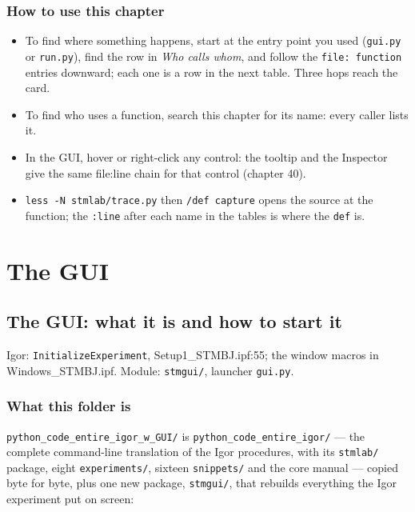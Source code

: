 \section{How to use this chapter}

\begin{itemize}[leftmargin=*]
\item To find where something happens, start at the entry point you used (\texttt{gui.\discretionary{}{}{}py} or \texttt{run.\discretionary{}{}{}py}), find the row in \emph{Who calls whom}, and follow the \texttt{file: function} entries downward; each one is a row in the next table. Three hops reach the card.
\item To find who uses a function, search this chapter for its name: every caller lists it.
\item In the GUI, hover or right-click any control: the tooltip and the Inspector give the same file:line chain for that control (chapter 40).
\item \texttt{less -N stmlab/\discretionary{}{}{}trace.\discretionary{}{}{}py} then \texttt{/\discretionary{}{}{}def capture} opens the source at the function; the \texttt{:line} after each name in the tables is where the \texttt{def} is.
\end{itemize}

\part{The GUI}
\setcounter{chapter}{39}
\chapter{The GUI: what it is and how to start it}

\begin{keybox}\small Igor: \texttt{Initialize\discretionary{}{}{}Experiment}, Setup1\_STMBJ.ipf:55; the window macros in Windows\_STMBJ.ipf. Module: \texttt{stmgui/\discretionary{}{}{}}, launcher \texttt{gui.\discretionary{}{}{}py}.\end{keybox}

\section{What this folder is}

\texttt{python\_\discretionary{}{}{}code\_\discretionary{}{}{}entire\_\discretionary{}{}{}igor\_\discretionary{}{}{}w\_\discretionary{}{}{}GUI/\discretionary{}{}{}} is \texttt{python\_\discretionary{}{}{}code\_\discretionary{}{}{}entire\_\discretionary{}{}{}igor/\discretionary{}{}{}} --- the complete command-line translation of the Igor procedures, with its \texttt{stmlab/\discretionary{}{}{}} package, eight \texttt{experiments/\discretionary{}{}{}}, sixteen \texttt{snippets/\discretionary{}{}{}} and the core manual --- copied byte for byte, plus one new package, \texttt{stmgui/\discretionary{}{}{}}, that rebuilds everything the Igor experiment put on screen:


